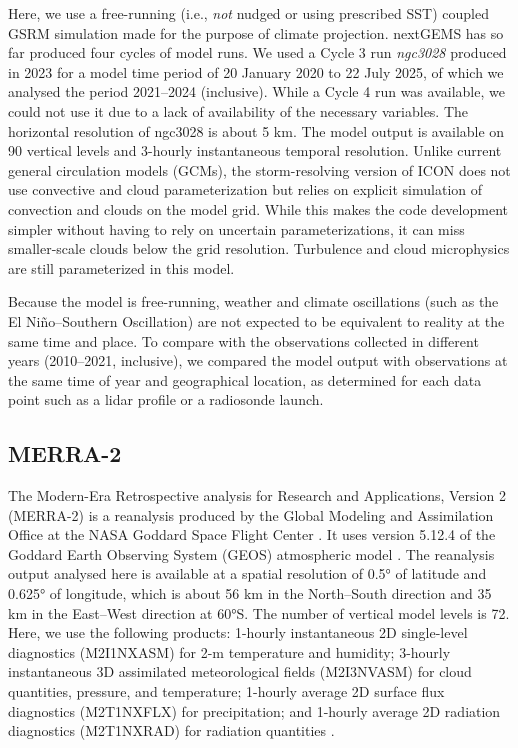 \documentclass[12pt,a4paper]{article}
\begin{document}
Here, we use a free-running (i.e., \emph{not} nudged or using prescribed SST)
coupled GSRM simulation made for the purpose of climate projection.  nextGEMS
has so far produced four cycles of model runs. We used a Cycle 3 run
\emph{ngc3028} produced in 2023 \citep{nextgems2023a,nextgems2023b} for a model
time period of 20 January 2020 to 22 July 2025, of which we analysed the period 2021--2024 (inclusive). While a Cycle 4 run was available, we could not
use it due to a lack of availability of the necessary variables. The horizontal
resolution of ngc3028 is about 5 km.  The model output is available on 90
vertical levels and 3-hourly instantaneous temporal resolution.  Unlike current
general circulation models (GCMs), the storm-resolving version of ICON does not
use convective and cloud parameterization but relies on explicit simulation of
convection and clouds on the model grid. While this makes the code development
simpler without having to rely on uncertain parameterizations, it can miss
smaller-scale clouds below the grid resolution.  Turbulence and cloud
microphysics are still parameterized in this model.

Because the model is free-running, weather and climate oscillations (such as
the El Niño--Southern Oscillation) are not expected to be equivalent to reality
at the same time and place. To compare with the observations collected in
different years (2010--2021, inclusive), we compared the model output with
observations at the same time of year and geographical location, as determined
for each data point such as a lidar profile or a radiosonde launch.

\subsection{MERRA-2}

The Modern-Era Retrospective analysis for Research and Applications, Version 2
(MERRA-2) is a reanalysis produced by the Global Modeling and Assimilation
Office at the NASA Goddard Space Flight Center \citep{gelaro2017}.  It uses
version 5.12.4 of the Goddard Earth Observing System (GEOS) atmospheric model
\citep{rienecker2008,molod2015}. The reanalysis output analysed here is
available at a spatial resolution of 0.5° of latitude and 0.625° of longitude,
which is about 56 km in the North--South direction and 35 km in the East--West
direction at 60°S. The number of vertical model levels is 72. Here, we use the
following products: 1-hourly instantaneous 2D single-level diagnostics
(M2I1NXASM) for 2-m temperature and humidity; 3-hourly instantaneous 3D
assimilated meteorological fields (M2I3NVASM) for cloud quantities, pressure,
and temperature; 1-hourly average 2D surface flux diagnostics (M2T1NXFLX) for
precipitation; and 1-hourly average 2D radiation diagnostics
(M2T1NXRAD) for radiation quantities \citep{merra2}.
\end{document}
